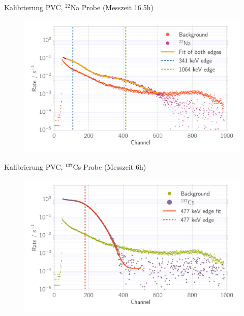 \documentclass[xcolor=x11names,compress]{beamer}
\renewcommand{\(}{\begin{columns}}
\renewcommand{\)}{\end{columns}}
\newcommand{\<}[1]{\begin{column}{#1}}
\renewcommand{\>}{\end{column}}
\begin{document}
\begin{frame}[t]{Kalibrierung PVC, $^{22}$Na Probe (Messzeit 16.5h) }
\begin{figure}[htpb]
    \centering
    \includegraphics[width=1.0\linewidth]{../analysis/figures/calib_ps_na}
\label{fig:calib_ps_na}
\end{figure}
\end{frame}

\begin{frame}[t]{Kalibrierung PVC, $^{137}$Cs Probe (Messzeit 6h) }
\begin{figure}[htpb]
\centering
\includegraphics[width=1.0\linewidth]{../analysis/figures/calib_ps_cs}
\label{fig:calib_ps_cs}
\end{figure}
\end{frame}
\end{document}
